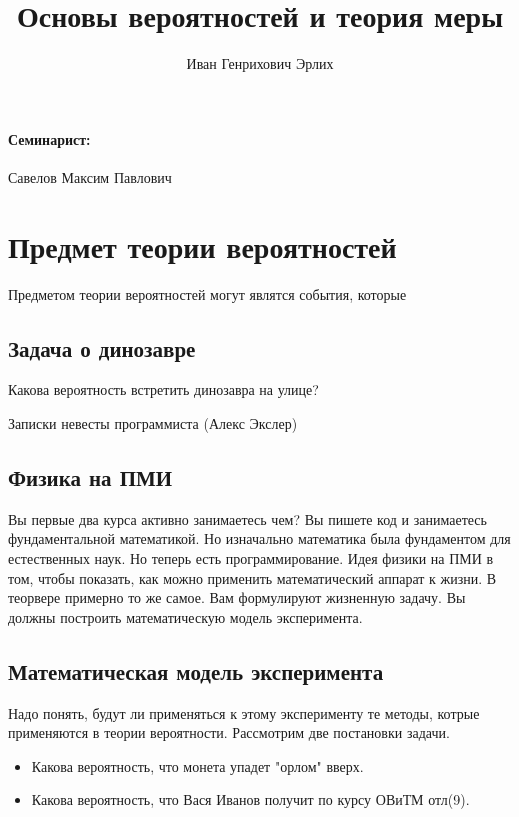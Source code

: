 \documentclass{article}
\author{Иван Генрихович Эрлих}
\title{Основы вероятностей и теория меры}
\begin{document}
  \maketitle
  
  \paragraph{Семинарист:} Савелов Максим Павлович
  
  \section*{Предмет теории вероятностей}
  Предметом теории вероятностей могут являтся события, которые
  
  \subsection*{Задача о динозавре}
  Какова вероятность встретить динозавра на улице? 
  \begin{flushright}
  Записки невесты программиста (Алекс Экслер)
  \end{flushright}
    
  \subsection*{Физика на ПМИ}
  Вы первые два курса активно занимаетесь чем? Вы пишете код и занимаетесь фундаментальной математикой. Но изначально математика была фундаментом для естественных наук. Но теперь есть программирование. Идея физики на ПМИ в том, чтобы показать, как можно применить математический аппарат к жизни. В теорвере примерно то же самое. Вам формулируют жизненную задачу. Вы должны построить математическую модель эксперимента.
  
  \subsection*{Математическая модель эксперимента}
  Надо понять, будут ли применяться к этому эксперименту те методы, котрые применяются в теории вероятности. Рассмотрим две постановки задачи.
  
  \begin{itemize} 
  \item Какова вероятность, что монета упадет "орлом" вверх.
  \item Какова вероятность, что Вася Иванов получит по курсу ОВиТМ отл(9).
  \end{itemize}
  
\end{document}
